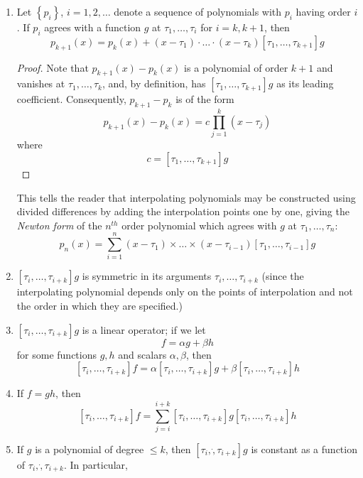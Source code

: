 \documentclass[12pt]{article}
\theoremstyle{definition}
\begin{document}
\begin{enumerate} \label{dd_properties}
\item \label{eq:dd_property_1} Let $\left\{ p_i \right\}$, $i=1,2,\dots$ denote a sequence of polynomials with $p_i$ having order $i$. If $p_i$ agrees with a function $g$ at $\tau_1,\dots, \tau_i$ for $i=k,k+1$, then 
	\begin{equation*} 
	p_{k+1}\left(x\right) = p_k\left(x\right) + \left(x-\tau_1\right)\cdot \dots \cdot \left(x-\tau_k\right)\left[\tau_1,\dots,\tau_{k+1}\right]g
	\end{equation*}
	\begin{proof}
	Note that $p_{k+1}\left(x\right) - p_{k}\left(x\right)$ is a polynomial of order $k+1$ and vanishes at $\tau_1,\dots,\tau_k$, and, by definition, has $\left[\tau_1,\dots,\tau_{k+1}\right]g$ as its leading coefficient. Consequently, $p_{k+1}-p_k$ is of the form
	\begin{equation*}
	p_{k+1}\left(x\right) - p_{k}\left(x\right) = c\prod_{j=1}^k \left(x-\tau_j\right)
	\end{equation*}
	\noindent
	where 
	\[
	c = \left[\tau_1,\dots,\tau_{k+1}\right]g
	\]
	\end{proof}
	This tells the reader that interpolating polynomials may be constructed using divided differences by adding the interpolation points one by one, giving the \emph{Newton form} of the $n^{th}$ order polynomial which agrees with $g$ at $\tau_1,\dots,\tau_n$:
	\[
	p_n\left(x\right) = \sum_{i=1}^n \left(x-\tau_{1}\right)\times \dots \times \left(x-\tau_{i-1}\right) \left[\tau_1,\dots,\tau_{i-1} \right]g
	\]
\item \label{eq:dd_property_2} $\left[\tau_i,\dots,\tau_{i+k} \right]g$	is symmetric in its arguments $\tau_i,\dots, \tau_{i+k}$ (since the interpolating polynomial depends only on the points of interpolation and not the order in which they are specified.)
\item \label{eq:dd_property_3} $\left[\tau_i,\dots,\tau_{i+k} \right]g$ is a linear operator; if we let 
\[
f= \alpha g + \beta h
\]
\noindent
for some functions $g,h$ and scalars $\alpha, \beta$, then
\[
\left[\tau_i,\dots,\tau_{i+k} \right]f = \alpha\left[\tau_i,\dots,\tau_{i+k} \right]g + \beta\left[\tau_i,\dots,\tau_{i+k} \right]h
\]
\item \label{eq:dd_property_4} If $f=gh$, then
\[
\left[\tau_i,\dots,\tau_{i+k} \right]f  = \sum_{j=i}^{i+k} \left[\tau_i,\dots,\tau_{i+k} \right]g \left[\tau_i,\dots,\tau_{i+k} \right]h 
\]
\item \label{eq:dd_property_5} If $g$ is a polynomial of degree $\le k$, then $\left[\tau_i,\dot,\tau_{i+k}\right]g$ is constant as a function of $\tau_i,\dot,\tau_{i+k}$. In particular,

\end{enumerate}
\end{document}
